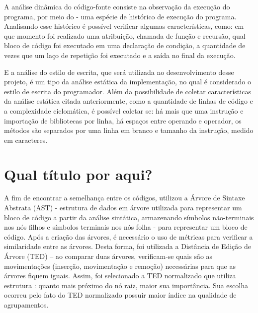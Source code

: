 		A análise dinâmica do código-fonte consiste na observação da execução do programa,
		por meio do  - uma espécie de histórico de execução do programa. Analisando
		esse histórico é possível verificar algumas características, como: em que momento foi
		realizado uma atribuição, chamada de função e recursão, qual bloco de código foi
		executado em uma declaração de condição, a quantidade de vezes que um laço de repetição
		foi executado e a saída no final da execução.
		
		E a análise do estilo de escrita, que será utilizada no desenvolvimento desse projeto,
		é um tipo da análise estática da implementação, no qual é considerado o estilo de
		escrita do programador. Além da possibilidade de coletar características da análise
		estática citada anteriormente, como a quantidade de linhas de código e a complexidade
		ciclomática, é possível coletar se: há mais que uma instrução e importação de bibliotecas
		por linha, há espaços entre operando e operador, os métodos são separados por uma linha
		em branco e tamanho da instrução, medido em caracteres.

	\section{Qual título por aqui?}
	
	    A fim de encontrar a semelhança entre os códigos, 
	    utilizou a Árvore de Sintaxe Abstrata (AST) - estrutura de dados em árvore
	    utilizada para representar um bloco de código a partir da análise sintática,
	    armazenando símbolos não-terminais nos nós filhos e símbolos terminais nos
	    nós folha - para representar um bloco de código. Após a criação das árvores,
	    é necessário o uso de métricas para verificar a similaridade entre as árvores.
	    Desta forma, foi utilizada a Distância de Edição de Árvore (TED) – ao comparar
	    duas árvores, verificam-se quais são as movimentações (inserção, movimentação
	    e remoção) necessárias para que as árvores fiquem iguais. Assim, foi
	    selecionado a TED normalizado que utiliza estrutura :
	    quanto mais próximo do nó raiz, maior sua importância. Sua escolha ocorreu
	    pelo fato do TED normalizado possuir maior índice na qualidade de agrupamentos.
	    
